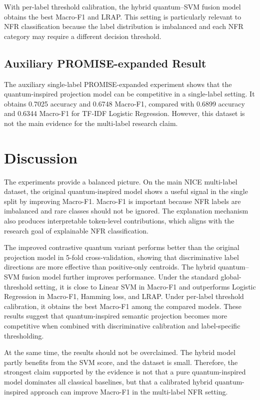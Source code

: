 \documentclass[conference]{IEEEtran}
\begin{document}
With per-label threshold calibration, the hybrid quantum--SVM fusion model obtains the best Macro-F1 and LRAP. This setting is particularly relevant to NFR classification because the label distribution is imbalanced and each NFR category may require a different decision threshold.

\subsection{Auxiliary PROMISE-expanded Result}
The auxiliary single-label PROMISE-expanded experiment shows that the quantum-inspired projection model can be competitive in a single-label setting. It obtains 0.7025 accuracy and 0.6748 Macro-F1, compared with 0.6899 accuracy and 0.6344 Macro-F1 for TF-IDF Logistic Regression. However, this dataset is not the main evidence for the multi-label research claim.

\section{Discussion}
The experiments provide a balanced picture. On the main NICE multi-label dataset, the original quantum-inspired model shows a useful signal in the single split by improving Macro-F1. Macro-F1 is important because NFR labels are imbalanced and rare classes should not be ignored. The explanation mechanism also produces interpretable token-level contributions, which aligns with the research goal of explainable NFR classification.

The improved contrastive quantum variant performs better than the original projection model in 5-fold cross-validation, showing that discriminative label directions are more effective than positive-only centroids. The hybrid quantum--SVM fusion model further improves performance. Under the standard global-threshold setting, it is close to Linear SVM in Macro-F1 and outperforms Logistic Regression in Macro-F1, Hamming loss, and LRAP. Under per-label threshold calibration, it obtains the best Macro-F1 among the compared models. These results suggest that quantum-inspired semantic projection becomes more competitive when combined with discriminative calibration and label-specific thresholding.

At the same time, the results should not be overclaimed. The hybrid model partly benefits from the SVM score, and the dataset is small. Therefore, the strongest claim supported by the evidence is not that a pure quantum-inspired model dominates all classical baselines, but that a calibrated hybrid quantum-inspired approach can improve Macro-F1 in the multi-label NFR setting.
\end{document}
